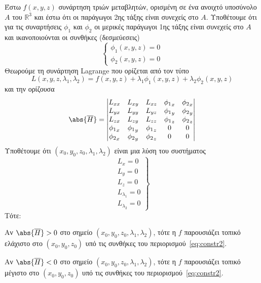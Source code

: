 \begin{thm}
    Έστω $ f(x,y,z) $ συνάρτηση τριών μεταβλητών, ορισμένη σε ένα ανοιχτό 
    υποσύνολο $A$ του $ \mathbb{R}^{3} $ και έστω ότι οι παράγωγοι 2ης τάξης είναι 
    συνεχείς στο $A$. Υποθέτουμε ότι για τις συναρτήσεις $ \phi _{1} $ και 
    $ \phi _{2} $ οι μερικές παράγωγοι 1ης τάξης είναι συνεχείς στο $A$ και 
    ικανοποιούνται οι συνθήκες (δεσμεύεσεις) 
    \[
        \begin{cases}\label{eq:constr2}
            \phi_{1} (x,y,z) = 0 \\
            \phi_{2} (x,y,z) = 0 
        \end{cases} 
    \] 
    Θεωρούμε τη συνάρτηση Lagrange που ορίζεται από τον τύπο
    \[
        L(x,y,z, \lambda _{1}, \lambda _{2}) = f(x,y,z) + \lambda _{1} 
        \phi _{1}(x,y,z) + \lambda _{2} \phi _{2}(x,y,z) 
    \] 
    και την ορίζουσα 
    \[
        \abs{\overline{H}} = 
        \begin{vmatrix}
            L_{xx} & L_{xy} & L_{xz} & {\phi _{1}}_{x} & {\phi _{2}}_{x} \\
            L_{yx} & L_{yy} & L_{yz} & {\phi _{1}}_{y} & {\phi _{2}}_{y} \\
            L_{zx} & L_{zy} & L_{zz} & {\phi _{1}}_{z} & {\phi _{2}}_{z} \\
            {\phi _{1}}_{x} & {\phi _{1}}_{y} & {\phi _{1}}_{z} & 0 & 0 \\         
            {\phi _{2}}_{x} & {\phi _{2}}_{y} & {\phi _{2}}_{z} & 0 & 0 \\         
        \end{vmatrix} 
    \] 
    Υποθέτουμε ότι $ (x_{0}, y_{0}, z_{0}, \lambda _{1}, \lambda _{2}) $ είναι μια 
    λύση του συστήματος 
    \[
        \left.
            \begin{matrix}
                L_{x} = 0 \\
                L_{y} = 0 \\
                L_{z} = 0 \\
                L_{\lambda _{1}} = 0 \\
                L_{\lambda _{2}} = 0 
            \end{matrix}
        \right\} 
    \]
    Τότε:
    \begin{myitemize}
        \item Αν $ \abs{\overline{H}} > 0 $ στο σημείο 
            $ (x_{0}, y_{0}, z_{0}, \lambda _{1}, \lambda _{2}) $, τότε η $f$ 
            παρουσιάζει τοπικό ελάχιστο στο $ (x_{0}, y_{0}, z_{0}) $ υπό τις 
            συνθήκες του περιορισμού~\eqref{eq:constr2}.
        \item Αν $ \abs{\overline{H}} < 0 $ στο σημείο 
            $ (x_{0}, y_{0}, z_{0}, \lambda _{1}, \lambda _{2}) $, τότε η $f$ 
            παρουσιάζει τοπικό μέγιστο στο $ (x_{0}, y_{0}, z_{0}) $ υπό τις 
            συνθήκες του περιορισμού~\eqref{eq:constr2}.
    \end{myitemize}
\end{thm}